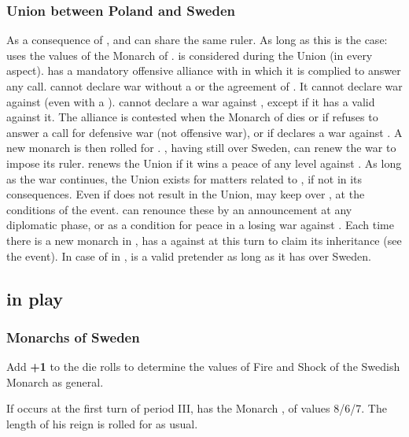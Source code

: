 \subsubsection{Union between Poland and Sweden}
\label{chSpecific:Sweden:Polish Union}
\aparag As a consequence of , \SUE
and \POL can share the same ruler. As long as this is the case:
\bparag \SUE uses the values of the Monarch of \POL. \SUE is considered
 during the Union (in every aspect).
\bparag \SUE has a mandatory offensive alliance with \POL in which it is
complied to answer any call.
\bparag \SUE cannot declare war without a \CB or the agreement of \POL.
It cannot declare war against \POL (even with a \CB).
\bparag \POL cannot declare a war against \SUE, except if it has a valid
\CB against it.
\aparag The alliance is contested when the Monarch of \POL dies or if
\POL refuses to answer a call for defensive war (not offensive war), or
if \POL declares a war against \SUE.
\bparag A new monarch is then rolled for \SUE.
\bparag \POL, having still  over Sweden, can
renew the war to impose its ruler. \POL renews the Union if it wins a
peace of any level against \SUE. As long as the war continues, the Union
exists for matters related to \VP, if not in its consequences.
 Even if 
does not result in the Union, \POL may keep  over
\SUE, at the conditions of the event.
\bparag \POL can renounce these  by an
announcement at any diplomatic phase, or as a condition for peace in a
losing war against \SUE.
\bparag Each time there is a new monarch in \SUE, \POL has a \CB against
\SUE at this turn to claim its inheritance (see the event).
\bparag In case of  in \SUE, \POL is a valid
pretender as long as it has  over Sweden.

\subsection{ in play}
\subsubsection{Monarchs of Sweden}
 Add {\bf +1} to the die rolls to determine the
values of Fire and Shock of the Swedish Monarch as general.

 If  occurs
at the first turn of period III, \SUE has the Monarch , of values 8/6/7. The length of his reign is rolled for as usual.

